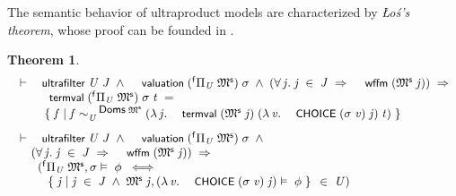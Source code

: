 \documentclass{llncs}
\newtheorem{thm}{Theorem}[chapter]
\newenvironment{holmath}{\begin{displaymath}\begin{array}{l}}{\end{array}\end{displaymath}\ignorespacesafterend}
\renewcommand{\HOLConst}[1]{{\textsf{\upshape\small #1}}}
\renewcommand{\HOLTokenBar}{\mbox{$|$}}
\begin{document}
The semantic behavior of ultraproduct models are characterized by \emph{\L o\'s's theorem}, whose proof can be founded in \cite{ChangKeisler1990}.

\begin{thm}
{\upshape\cite[Theorem A.19 (\L o\'s's theorem)]{Blackburn}}
\begin{holmath}
  \ensuremath{\HOLTokenTurnstile}\HOLConst{ultrafilter}\;\HOLFreeVar{U}\;\HOLFreeVar{J}\;\HOLSymConst{\HOLTokenConj{}}\;\HOLConst{valuation}\;({}^{\sf f}\Pi\sb{\HOLFreeVar{U}}\;\HOLFreeVar{\ensuremath{\mathfrak{M}\sp{\sf s}}})\;\HOLFreeVar{\ensuremath{\sigma}}\;\HOLSymConst{\HOLTokenConj{}}\;(\HOLSymConst{\HOLTokenForall{}}\HOLBoundVar{j}.\;\HOLBoundVar{j}\;\HOLSymConst{\HOLTokenIn{}}\;\HOLFreeVar{J}\;\HOLSymConst{\HOLTokenImp{}}\;\HOLConst{wffm}\;(\HOLFreeVar{\ensuremath{\mathfrak{M}\sp{\sf s}}}\;\HOLBoundVar{j}))\;\HOLSymConst{\HOLTokenImp{}}\\
\;\;\;\;\;\;\;\HOLConst{termval}\;({}^{\sf f}\Pi\sb{\HOLFreeVar{U}}\;\HOLFreeVar{\ensuremath{\mathfrak{M}\sp{\sf s}}})\;\HOLFreeVar{\ensuremath{\sigma}}\;\HOLFreeVar{t}\;\HOLSymConst{=}\\
\;\;\;\;\;\;\;\;\;\HOLTokenLeftbrace{}\HOLBoundVar{f}\;\HOLTokenBar{}\;\HOLBoundVar{f}\sim\sb{\HOLFreeVar{U}}\sp{\HOLConst{Doms}\;\HOLFreeVar{\ensuremath{\mathfrak{M}\sp{\sf s}}}}(\HOLTokenLambda{}\HOLBoundVar{j}.\;\HOLConst{termval}\;(\HOLFreeVar{\ensuremath{\mathfrak{M}\sp{\sf s}}}\;\HOLBoundVar{j})\;(\HOLTokenLambda{}\HOLBoundVar{v}.\;\HOLConst{CHOICE}\;(\HOLFreeVar{\ensuremath{\sigma}}\;\HOLBoundVar{v})\;\HOLBoundVar{j})\;\HOLFreeVar{t})\HOLTokenRightbrace{} \\[3mm]
  \ensuremath{\HOLTokenTurnstile}\HOLConst{ultrafilter}\;\HOLFreeVar{U}\;\HOLFreeVar{J}\;\HOLSymConst{\HOLTokenConj{}}\;\HOLConst{valuation}\;({}^{\sf f}\Pi\sb{\HOLFreeVar{U}}\;\HOLFreeVar{\ensuremath{\mathfrak{M}\sp{\sf s}}})\;\HOLFreeVar{\ensuremath{\sigma}}\;\HOLSymConst{\HOLTokenConj{}}\\
\;\;\;\;\;(\HOLSymConst{\HOLTokenForall{}}\HOLBoundVar{j}.\;\HOLBoundVar{j}\;\HOLSymConst{\HOLTokenIn{}}\;\HOLFreeVar{J}\;\HOLSymConst{\HOLTokenImp{}}\;\HOLConst{wffm}\;(\HOLFreeVar{\ensuremath{\mathfrak{M}\sp{\sf s}}}\;\HOLBoundVar{j}))\;\HOLSymConst{\HOLTokenImp{}}\\
\;\;\;\;\;\;\;({}^{\sf f}\Pi\sb{\HOLFreeVar{U}}\;\HOLFreeVar{\ensuremath{\mathfrak{M}\sp{\sf s}}},\HOLFreeVar{\ensuremath{\sigma}}\ensuremath{\vDash}\;\HOLFreeVar{\ensuremath{\phi}}\;\HOLSymConst{\HOLTokenEquiv{}}\\
\;\;\;\;\;\;\;\;\;\;\HOLTokenLeftbrace{}\HOLBoundVar{j}\;\HOLTokenBar{}\;\HOLBoundVar{j}\;\HOLSymConst{\HOLTokenIn{}}\;\HOLFreeVar{J}\;\HOLSymConst{\HOLTokenConj{}}\;\HOLFreeVar{\ensuremath{\mathfrak{M}\sp{\sf s}}}\;\HOLBoundVar{j},(\HOLTokenLambda{}\HOLBoundVar{v}.\;\HOLConst{CHOICE}\;(\HOLFreeVar{\ensuremath{\sigma}}\;\HOLBoundVar{v})\;\HOLBoundVar{j})\ensuremath{\vDash}\;\HOLFreeVar{\ensuremath{\phi}}\HOLTokenRightbrace{}\;\HOLSymConst{\HOLTokenIn{}}\;\HOLFreeVar{U})
\end{holmath}
\end{thm}
\end{document}

